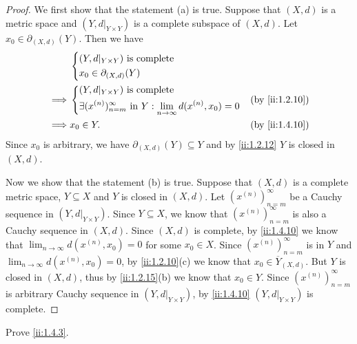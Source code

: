 \begin{proof}
  We first show that the statement (a) is true.
  Suppose that \((X, d)\) is a metric space and \((Y, d|_{Y \times Y})\) is a complete subspace of \((X, d)\).
  Let \(x_0 \in \partial_{(X, d)}(Y)\).
  Then we have
  \begin{align*}
             & \begin{dcases}
                 (Y, d|_{Y \times Y}) \text{ is complete} \\
                 x_0 \in \partial_{(X, d)}(Y)
               \end{dcases}                                                                                         \\
    \implies & \begin{dcases}
                 (Y, d|_{Y \times Y}) \text{ is complete} \\
                 \exists (x^{(n)})_{n = m}^\infty \text{ in } Y : \lim_{n \to \infty} d(x^{(n)}, x_0) = 0
               \end{dcases} &  & \by{ii:1.2.10}                   \\
    \implies & x_0 \in Y.                                                                                                      &  & \by{ii:1.4.10}
  \end{align*}
  Since \(x_0\) is arbitrary, we have \(\partial_{(X, d)}(Y) \subseteq Y\) and by \cref{ii:1.2.12} \(Y\) is closed in \((X, d)\).

  Now we show that the statement (b) is true.
  Suppose that \((X, d)\) is a complete metric space, \(Y \subseteq X\) and \(Y\) is closed in \((X, d)\).
  Let \((x^{(n)})_{n = m}^\infty\) be a Cauchy sequence in \((Y, d|_{Y \times Y})\).
  Since \(Y \subseteq X\), we know that \((x^{(n)})_{n = m}^\infty\) is also a Cauchy sequence in \((X, d)\).
  Since \((X, d)\) is complete, by \cref{ii:1.4.10} we know that \(\lim_{n \to \infty} d(x^{(n)}, x_0) = 0\) for some \(x_0 \in X\).
  Since \((x^{(n)})_{n = m}^\infty\) is in \(Y\) and \(\lim_{n \to \infty} d(x^{(n)}, x_0) = 0\), by \cref{ii:1.2.10}(c) we know that \(x_0 \in \overline{Y}_{(X, d)}\).
  But \(Y\) is closed in \((X, d)\), thus by \cref{ii:1.2.15}(b) we know that \(x_0 \in Y\).
  Since \((x^{(n)})_{n = m}^\infty\) is arbitrary Cauchy sequence in \((Y, d|_{Y \times Y})\), by \cref{ii:1.4.10} \((Y, d|_{Y \times Y})\) is complete.
\end{proof}

\exercisesection

\begin{ex}\label{ii:ex:1.4.1}
  Prove \cref{ii:1.4.3}.
\end{ex}

